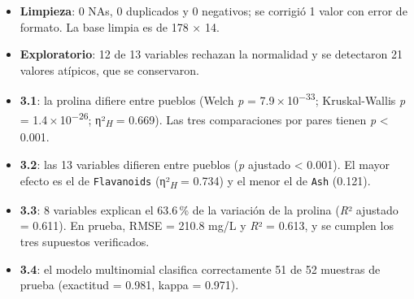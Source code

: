 \documentclass[10pt,letterpaper,twocolumn]{article}
\newcommand{\var}[1]{\texttt{#1}}
\newcommand{\etaH}{η²\textsubscript{\textit{H}}}
\newcommand{\pval}{\textit{p}}
\newcommand{\sci}[2]{#1\,×\,10\textsuperscript{−#2}}
\begin{document}
\begin{itemize}
  \item \textbf{Limpieza}: 0 NAs, 0 duplicados y 0 negativos; se corrigió 1 valor con error de formato. La base limpia es de 178 × 14.
  \item \textbf{Exploratorio}: 12 de 13 variables rechazan la normalidad y se detectaron 21 valores atípicos, que se conservaron.
  \item \textbf{3.1}: la prolina difiere entre pueblos (Welch \pval{} = \sci{7.9}{33}; Kruskal-Wallis \pval{} = \sci{1.4}{26}; \etaH{} = 0.669). Las tres comparaciones por pares tienen \pval{} < 0.001.
  \item \textbf{3.2}: las 13 variables difieren entre pueblos (\pval{} ajustado < 0.001). El mayor efecto es el de \var{Flavanoids} (\etaH{} = 0.734) y el menor el de \var{Ash} (0.121).
  \item \textbf{3.3}: 8 variables explican el 63.6\,\% de la variación de la prolina (\textit{R}² ajustado = 0.611). En prueba, RMSE = 210.8 mg/L y \textit{R}² = 0.613, y se cumplen los tres supuestos verificados.
  \item \textbf{3.4}: el modelo multinomial clasifica correctamente 51 de 52 muestras de prueba (exactitud = 0.981, kappa = 0.971).
\end{itemize}
\end{document}
